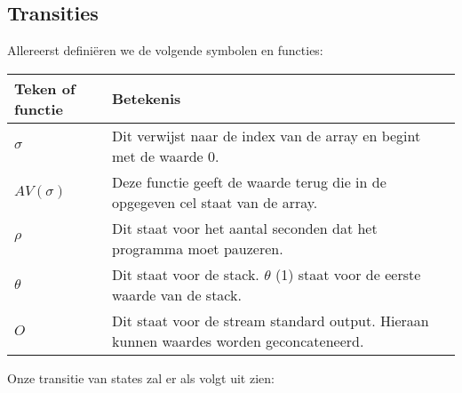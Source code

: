 \documentclass[11pt]{article}
\begin{document}
\subsection{Transities}
Allereerst defini\"eren we de volgende symbolen en functies:
\newline
\newline
\begin{tabular}{ | l | p{12cm} |}
    \hline
    Teken of functie & Betekenis \\ \hline
    \begin{math} \sigma \end{math} &  Dit verwijst naar de index van de array en begint met de waarde 0. \\ \hline
    \begin{math} AV(\sigma) \end{math} & Deze functie geeft de waarde terug die in de opgegeven cel staat van de array. \\ \hline
    \begin{math} \rho \end{math} &  Dit staat voor het aantal seconden dat het programma moet pauzeren. \\ \hline
    \begin{math} \theta \end{math} &  Dit staat voor de stack. \begin{math}\theta\end{math} (1) staat voor de eerste waarde van de stack. \\ \hline
    \begin{math} O \end{math} &  Dit staat voor de stream standard output. Hieraan kunnen waardes worden geconcateneerd. \\ \hline

\end{tabular}
\newline
\newline
\newline

Onze transitie van states zal er als volgt uit zien:

\begin{prooftree}
\end{prooftree}
\end{document}
